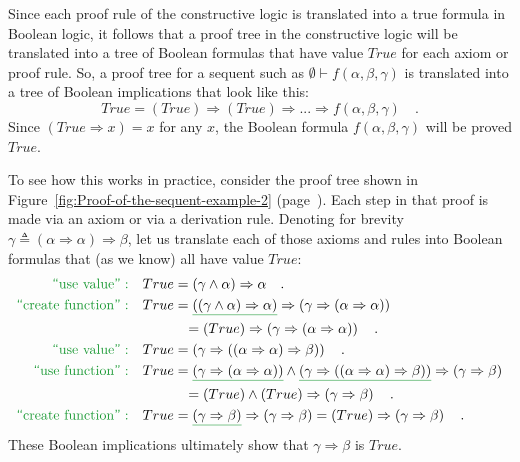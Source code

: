 Since each proof rule of the constructive logic is translated into
a true formula in Boolean logic, it follows that a proof tree in the
constructive logic will be translated into a tree of Boolean formulas
that have value $True$ for each axiom or proof rule. So, a proof
tree for a sequent such as $\emptyset\vdash f(\alpha,\beta,\gamma)$
is translated into a tree of Boolean implications that look like this:
\[
True=(True)\Rightarrow(True)\Rightarrow...\Rightarrow f(\alpha,\beta,\gamma)\quad.
\]
Since $\left(True\Rightarrow x\right)=x$ for any $x$, the Boolean
formula $f(\alpha,\beta,\gamma)$ will be proved $True$.

To see how this works in practice, consider the proof tree shown in
Figure~\ref{fig:Proof-of-the-sequent-example-2} (page~\pageref{fig:Proof-of-the-sequent-example-2}).
Each step in that proof is made via an axiom or via a derivation rule.
Denoting for brevity $\gamma\triangleq\left(\alpha\Rightarrow\alpha\right)\Rightarrow\beta$,
let us translate each of those axioms and rules into Boolean formulas
that (as we know) all have value $True$:
\begin{align*}
{\color{greenunder}\text{\textsf{``}use value\textsf{''}}:}\quad & True=\left(\gamma\wedge\alpha\right)\Rightarrow\alpha\quad.\\
{\color{greenunder}\text{\textsf{``}create function\textsf{''}}:}\quad & True=\gunderline{\left(\left(\gamma\wedge\alpha\right)\Rightarrow\alpha\right)}\Rightarrow\left(\gamma\Rightarrow\left(\alpha\Rightarrow\alpha\right)\right)\\
 & \quad\quad\quad=(True)\Rightarrow\left(\gamma\Rightarrow\left(\alpha\Rightarrow\alpha\right)\right)\quad.\\
{\color{greenunder}\text{\textsf{``}use value\textsf{''}}:}\quad & True=\left(\gamma\Rightarrow\left(\left(\alpha\Rightarrow\alpha\right)\Rightarrow\beta\right)\right)\quad.\\
{\color{greenunder}\text{\textsf{``}use function\textsf{''}}:}\quad & True=\gunderline{(\gamma\Rightarrow(\alpha\Rightarrow\alpha))}\wedge\gunderline{\left(\gamma\Rightarrow\left(\left(\alpha\Rightarrow\alpha\right)\Rightarrow\beta\right)\right)}\Rightarrow\left(\gamma\Rightarrow\beta\right)\\
 & \quad\quad\quad=(True)\wedge(True)\Rightarrow\left(\gamma\Rightarrow\beta\right)\quad.\\
{\color{greenunder}\text{\textsf{``}create function\textsf{''}}:}\quad & True=\gunderline{\left(\gamma\Rightarrow\beta\right)}\Rightarrow\left(\gamma\Rightarrow\beta\right)=(True)\Rightarrow\left(\gamma\Rightarrow\beta\right)\quad.
\end{align*}
These Boolean implications ultimately show that $\gamma\Rightarrow\beta$
is $True$.


